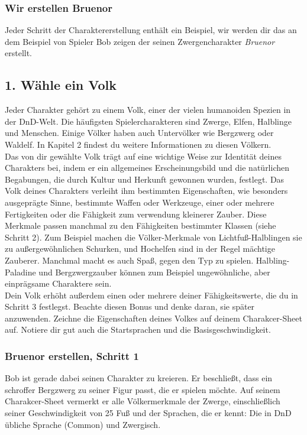 \subsubsection{Wir erstellen Bruenor}
Jeder Schritt der Charaktererstellung enthält ein Beispiel, wir werden dir das an dem Beispiel von Spieler Bob zeigen der seinen Zwergencharakter \textit{Bruenor} erstellt.

\subsection*{1. Wähle ein Volk}
Jeder Charakter gehört zu einem Volk, einer der vielen humanoiden Spezien in der DnD-Welt. Die häufigsten Spielercharakteren sind Zwerge, Elfen, Halblinge und Menschen. Einige Völker haben auch Untervölker wie Bergzwerg oder Waldelf. In Kapitel 2 findest du weitere Informationen zu diesen Völkern.\\
Das von dir gewählte Volk trägt auf eine wichtige Weise zur Identität deines Charakters bei, indem er ein allgemeines Erscheinungsbild und die natürlichen Begabungen, die durch Kultur und Herkunft gewonnen wurden, festlegt. Das Volk deines Charakters verleiht ihm bestimmten Eigenschaften, wie besonders ausgeprägte Sinne, bestimmte Waffen oder Werkzeuge, einer oder mehrere Fertigkeiten oder die Fähigkeit zum verwendung kleinerer Zauber. Diese Merkmale passen manchmal zu den Fähigkeiten bestimmter Klassen (siehe Schritt 2). Zum Beispiel machen die Völker-Merkmale von Lichtfuß-Halblingen sie zu außergewöhnlichen Schurken, und Hochelfen sind in der Regel mächtige Zauberer. Manchmal macht es auch Spaß, gegen den Typ zu spielen. Halbling-Paladine und Bergzwergzauber können zum Beispiel ungewöhnliche, aber einprägsame Charaktere sein.\\
Dein Volk erhöht außerdem einen oder mehrere deiner Fähigkeitswerte, die du in Schritt 3 festlegst. Beachte diesen Bonus und denke daran, sie später anzuwenden. Zeichne die Eigenschaften deines Volkes auf deinem Charakcer-Sheet auf. Notiere dir gut auch die Startsprachen und die Basisgeschwindigkeit.

\subsubsection{Bruenor erstellen, Schritt 1}
Bob ist gerade dabei seinen Charakter zu kreieren. Er beschließt, dass ein schroffer Bergzwerg zu seiner Figur passt, die er spielen möchte. Auf seinem Charakcer-Sheet vermerkt er alle Völkermerkmale der Zwerge, einschließlich seiner Geschwindigkeit von 25 Fuß und der Sprachen, die er kennt: Die in DnD übliche Sprache (Common) und Zwergisch.

